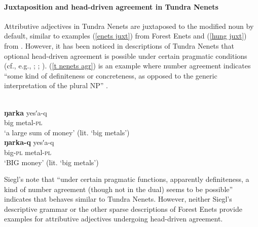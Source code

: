 \paragraph*{Juxtaposition and head\hyp{}driven agreement in Tundra Nenets}
Attributive adjectives in Tundra Nenets are juxtaposed to the modified noun by default, similar to examples (\ref{enets juxt}) from Forest Enets and (\ref{hung juxt}) from . However, it has been noticed in descriptions of Tundra Nenets that optional head\hyp{}driven agreement is possible under certain pragmatic conditions (cf., e.g., \citealt[50, passim]{jalava2013a}; \citealt[151–152, passim]{nikolaeva2014a}; \citealt[544]{salminen1998a}). (\ref{t nenets agr}) is an example where number agreement indicates “some kind of definiteness or concreteness, as opposed to the generic interpretation of the plural NP” \citep[152]{nikolaeva2014a}.
\begin{exe}
\label{t nenets agr}
\begin{xlist}
\\
\gll	\textbf{ŋarka} 	yesʹa-q\\
	big			metal\textsc{-pl}\\
\glt	‘a large sum of money’ (lit. ‘big metals’)
\\
\gll	\textbf{ŋarka-q} 	yesʹa-q\\
	big\textsc{-pl}		metal\textsc{-pl}\\
\glt	‘BIG money’ (lit. ‘big metals’)
\end{xlist}
\end{exe}
Siegl's note that “under certain pragmatic functions, apparently definiteness, a kind of number agreement (though not in the dual) seems to be possible” \citep[177]{siegl2013a} indicates that  behaves similar to Tundra Nenets. However, neither Siegl's descriptive grammar or the other sparse descriptions of Forest Enets provide examples for attributive adjectives undergoing head\hyp{}driven agreement. 

